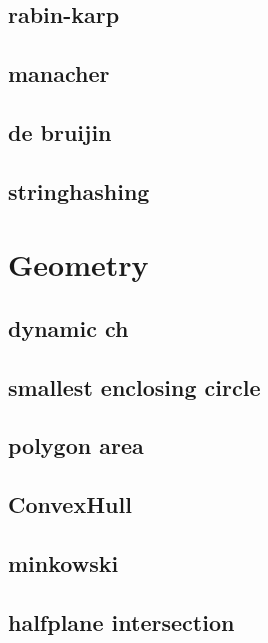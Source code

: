\subsection{rabin-karp}
\raggedbottom
\hrulefill
\subsection{manacher}
\raggedbottom
\hrulefill
\subsection{de bruijin}
\raggedbottom
\hrulefill
\subsection{stringhashing}
\raggedbottom
\hrulefill

\section{Geometry}
\subsection{dynamic ch}
\raggedbottom
\hrulefill
\subsection{smallest enclosing circle}
\raggedbottom
\hrulefill
\subsection{polygon area}
\raggedbottom
\hrulefill
\subsection{ConvexHull}
\raggedbottom
\hrulefill
\subsection{minkowski}
\raggedbottom
\hrulefill
\subsection{halfplane intersection}
\raggedbottom
\hrulefill
